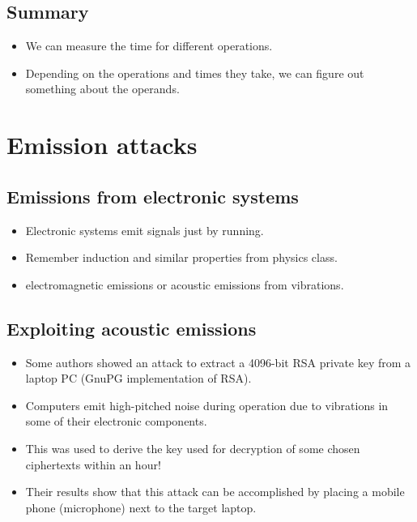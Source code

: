 \subsection{Summary}

\begin{frame}
  \begin{itemize}
    \item We can measure the time for different operations.
    \item Depending on the operations and times they take, we can figure out 
      something about the operands.
  \end{itemize}
\end{frame}


\section{Emission attacks}

\subsection{Emissions from electronic systems}

\begin{frame}
  \begin{itemize}
    \item Electronic systems emit signals just by running.
    \item Remember induction and similar properties from physics class.
    \item \Eg electromagnetic emissions or acoustic emissions from vibrations.
  \end{itemize}
\end{frame}

\subsection{Exploiting acoustic emissions}

\begin{frame}
  \begin{itemize}
    \item Some authors showed an attack to 
      extract a 4096-bit RSA private key from a laptop PC (GnuPG implementation 
      of RSA).

    \item Computers emit high-pitched noise during operation due to vibrations 
      in some of their electronic components.

    \item This was used to derive the key used for decryption of some chosen 
      ciphertexts within an hour!

    \item Their results show that this attack can be accomplished by placing 
      a mobile phone (microphone) next to the target laptop.
  \end{itemize}
\end{frame}


